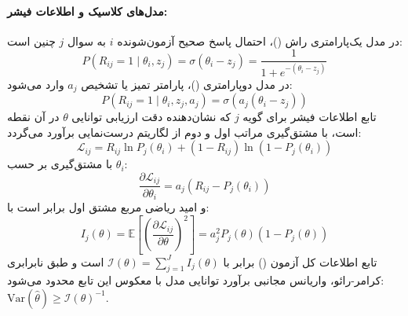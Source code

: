 \paragraph*{مدل‌های کلاسیک  و اطلاعات فیشر:}
در مدل یک‌پارامتری راش ()، احتمال پاسخ صحیح آزمون‌شونده $i$ به سوال $j$ چنین است:
\begin{equation}
    P(R_{ij} = 1 \mid \theta_i, z_j) = \sigma(\theta_i - z_j) = \frac{1}{1 + e^{-(\theta_i - z_j)}}
\end{equation}
در مدل دوپارامتری ()، پارامتر تمیز یا تشخیص $a_j$ وارد می‌شود:
\begin{equation}
    P(R_{ij} = 1 \mid \theta_i, z_j, a_j) = \sigma(a_j(\theta_i - z_j))
\end{equation}
تابع اطلاعات فیشر برای گویه $j$ که نشان‌دهنده دقت ارزیابی توانایی $\theta$ در آن نقطه است، با مشتق‌گیری مراتب اول و دوم از لگاریتم درست‌نمایی برآورد می‌گردد:
\begin{equation}
    \mathcal{L}_{ij} = R_{ij} \ln P_j(\theta_i) + (1 - R_{ij}) \ln (1 - P_j(\theta_i))
\end{equation}
با مشتق‌گیری بر حسب $\theta_i$:
\begin{equation}
    \frac{\partial \mathcal{L}_{ij}}{\partial \theta_i} = a_j (R_{ij} - P_j(\theta_i))
\end{equation}
و امید ریاضی مربع مشتق اول برابر است با:
\begin{equation}
    I_j(\theta) = \mathbb{E} \left[ \left( \frac{\partial \mathcal{L}_{ij}}{\partial \theta} \right)^2 \right] = a_j^2 P_j(\theta) (1 - P_j(\theta))
\end{equation}
تابع اطلاعات کل آزمون () برابر با $\mathcal{I}(\theta) = \sum_{j=1}^J I_j(\theta)$ است و طبق نابرابری کرامر-رائو، واریانس مجانبی برآورد توانایی مدل با معکوس این تابع محدود می‌شود: $\text{Var}(\hat{\theta}) \ge \mathcal{I}(\theta)^{-1}$.


